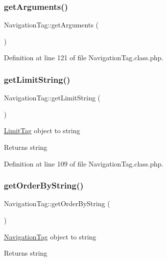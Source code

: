 \subsubsection{\texorpdfstring{get\+Arguments()}{getArguments()}}
{\footnotesize\ttfamily Navigation\+Tag\+::get\+Arguments (\begin{DoxyParamCaption}{ }\end{DoxyParamCaption})}



Definition at line 121 of file Navigation\+Tag.\+class.\+php.

\hypertarget{classNavigationTag_a9adb174f58ed2ef92137970d0a7b2c81}{}\label{classNavigationTag_a9adb174f58ed2ef92137970d0a7b2c81} 
\subsubsection{\texorpdfstring{get\+Limit\+String()}{getLimitString()}}
{\footnotesize\ttfamily Navigation\+Tag\+::get\+Limit\+String (\begin{DoxyParamCaption}{ }\end{DoxyParamCaption})}

\hyperlink{classLimitTag}{Limit\+Tag} object to string \begin{DoxyReturn}{Returns}
string 
\end{DoxyReturn}


Definition at line 109 of file Navigation\+Tag.\+class.\+php.

\hypertarget{classNavigationTag_a5d0ad196e149753b1adb58a1883f369d}{}\label{classNavigationTag_a5d0ad196e149753b1adb58a1883f369d} 
\subsubsection{\texorpdfstring{get\+Order\+By\+String()}{getOrderByString()}}
{\footnotesize\ttfamily Navigation\+Tag\+::get\+Order\+By\+String (\begin{DoxyParamCaption}{ }\end{DoxyParamCaption})}

\hyperlink{classNavigationTag}{Navigation\+Tag} object to string \begin{DoxyReturn}{Returns}
string 
\end{DoxyReturn}


